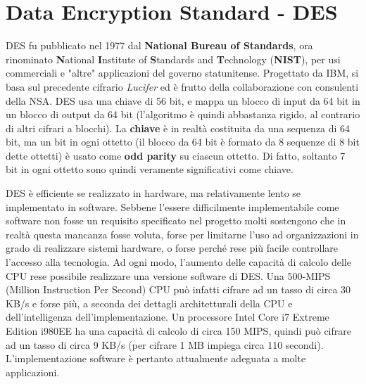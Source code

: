 \section{Data Encryption Standard - DES}
DES fu pubblicato nel 1977 dal \textbf{National Bureau of Standards}, ora rinominato \textbf{N}ational \textbf{I}nstitute of \textbf{S}tandards and \textbf{T}echnology (\textbf{NIST}), per usi commerciali e "altre" applicazioni del governo statunitense. Progettato da IBM, si basa sul precedente cifrario \textit{Lucifer} ed è frutto della collaborazione con consulenti della NSA. DES usa una chiave di 56 bit, e mappa un blocco di input da 64 bit in un blocco di output da 64 bit (l'algoritmo è quindi abbastanza rigido, al contrario di altri cifrari a blocchi). La \textbf{chiave} è in realtà costituita da una sequenza di 64 bit, ma un bit in ogni ottetto (il blocco da 64 bit è formato da 8 sequenze di 8 bit dette ottetti) è usato come \textbf{odd parity} su ciascun ottetto. Di fatto, soltanto 7 bit in ogni ottetto sono quindi veramente significativi come chiave. \newline \newline

DES è efficiente se realizzato in hardware, ma relativamente lento se implementato in software. Sebbene l'essere difficilmente implementabile come software non fosse un requisito specificato nel progetto molti sostengono che in realtà questa mancanza fosse voluta, forse per limitarne l'uso ad organizzazioni in grado di realizzare sistemi hardware, o forse perché rese più facile controllare l'accesso alla tecnologia. Ad ogni modo, l'aumento delle capacità di calcolo delle CPU rese possibile realizzare una versione software di DES. Una 500-MIPS (Million Instruction Per Second) CPU può infatti cifrare ad un tasso di circa 30 KB/s e forse più, a seconda dei dettagli architetturali della CPU e dell'intelligenza dell'implementazione. Un processore Intel Core i7 Extreme Edition i980EE ha una capacità di calcolo di circa 150 MIPS, quindi può cifrare ad un tasso di circa 9 KB/s (per cifrare 1 MB impiega circa 110 secondi). L’implementazione software è pertanto attualmente adeguata a molte applicazioni.\newline \newline

